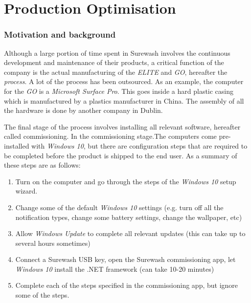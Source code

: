 \part{Production Optimisation}

\section{Motivation and background}
Although a large portion of time spent in Surewash involves the continuous development and maintenance of their products, a critical function of the company is the actual manufacturing of the {\slshape ELITE} and {\slshape GO}, hereafter the {\slshape process}. A lot of the process has been outsourced. As an example, the computer for the {\slshape GO} is a {\slshape Microsoft Surface Pro}. This goes inside a hard plastic casing which is manufactured by a plastics manufacturer in China. The assembly of all the hardware is done by another company in Dublin.

The final stage of the process involves installing all relevant software, hereafter called commissioning. In the commissioning stage.The computers come pre-installed with {\slshape Windows 10}, but there are configuration steps that are required to be completed before the product is shipped to the end user. As a summary of these steps are as follows:
\begin{enumerate}
    \item Turn on the computer and go through the steps of the {\slshape Windows 10} setup wizard.
    \item Change some of the default {\slshape Windows 10} settings (e.g. turn off all the notification types, change some battery settings, change the wallpaper, etc)
    \item Allow {\slshape Windows Update} to complete all relevant updates (this can take up to several hours sometimes)
    \item Connect a Surewash USB key, open the Surewash commissioning app, let {\slshape Windows 10} install the .NET framework (can take 10-20 minutes)
    \item Complete each of the steps specified in the commissioning app, but ignore some of the steps.
\end{enumerate}

